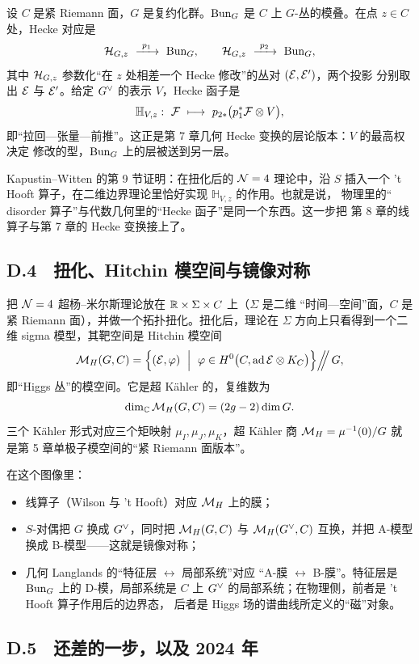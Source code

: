 设 $C$ 是紧 Riemann 面，$G$ 是复约化群。$\operatorname{Bun}_{G}$ 是 $C$ 上 $G$-丛的模叠。在点
$z\in C$ 处，Hecke 对应是
\[
  \cH_{G,z}\ \xrightarrow{\ p_{1}\ }\ \Bun_{G},
  \qquad
  \cH_{G,z}\ \xrightarrow{\ p_{2}\ }\ \Bun_{G},
\]
其中 $\mathcal{H}_{G,z}$ 参数化“在 $z$ 处相差一个 Hecke 修改”的丛对 $(\mathcal{E},\mathcal{E}')$，两个投影
分别取出 $\mathcal{E}$ 与 $\mathcal{E}'$。给定
$G^{\vee}$ 的表示 $V$，Hecke 函子是
\[
  \mathbb{H}_{V,z}:\ \cF\ \longmapsto\ p_{2*}\bigl(p_{1}^{*}\cF\otimes V\bigr),
\]
即“拉回—张量—前推”。这正是第 7 章几何 Hecke 变换的层论版本：$V$ 的最高权决定
修改的型，$\operatorname{Bun}_{G}$ 上的层被送到另一层。

Kapustin--Witten 的第 9 节证明：在扭化后的 $\mathcal{N}=4$ 理论中，沿 $S$ 插入一个
't Hooft 算子，在二维边界理论里恰好实现 $\mathbb{H}_{V,z}$ 的作用。也就是说，
物理里的“ disorder 算子”与代数几何里的“Hecke 函子”是同一个东西。这一步把
第 8 章的线算子与第 7 章的 Hecke 变换接上了。

\subsection*{D.4　扭化、Hitchin 模空间与镜像对称}

把 $\mathcal{N}=4$ 超杨--米尔斯理论放在 $\mathbb{R}\times\Sigma\times C$ 上（$\Sigma$ 是二维
“时间—空间”面，$C$ 是紧 Riemann 面），并做一个拓扑扭化。扭化后，理论在 $\Sigma$
方向上只看得到一个二维 sigma 模型，其靶空间是 Hitchin 模空间
\[
  \cM_{H}(G,C)=\Bigl\{(\cE,\varphi)\ \Bigm|\ \varphi\in H^{0}\bigl(C,\ad\cE\otimes K_{C}\bigr)\Bigr\}
  \Big/\!\!\!\Big/\,G,
\]
即“Higgs 丛”的模空间。它是超 Kähler 的，复维数为
\[
  \dim_{\mathbb{C}}\mathcal{M}_{H}(G,C)=(2g-2)\dim G .
\]
三个 Kähler 形式对应三个矩映射 $\mu_{I},\mu_{J},\mu_{K}$，超 Kähler 商
$\mathcal{M}_{H}=\mu^{-1}(0)/G$ 就是第 5 章单极子模空间的“紧 Riemann 面版本”。

在这个图像里：
\begin{itemize}
  \item 线算子（Wilson 与 't Hooft）对应 $\mathcal{M}_{H}$ 上的膜；
  \item $S$-对偶把 $G$ 换成 $G^{\vee}$，同时把 $\mathcal{M}_{H}(G,C)$ 与
        $\mathcal{M}_{H}(G^{\vee},C)$ 互换，并把 A-模型换成 B-模型——这就是镜像对称；
  \item 几何 Langlands 的“特征层 $\leftrightarrow$ 局部系统”对应
        “A-膜 $\leftrightarrow$ B-膜”。特征层是 $\operatorname{Bun}_{G}$ 上的 D-模，局部系统是
        $C$ 上 $G^{\vee}$ 的局部系统；在物理侧，前者是 't Hooft 算子作用后的边界态，
        后者是 Higgs 场的谱曲线所定义的“磁”对象。
\end{itemize}

\subsection*{D.5　还差的一步，以及 2024 年}


